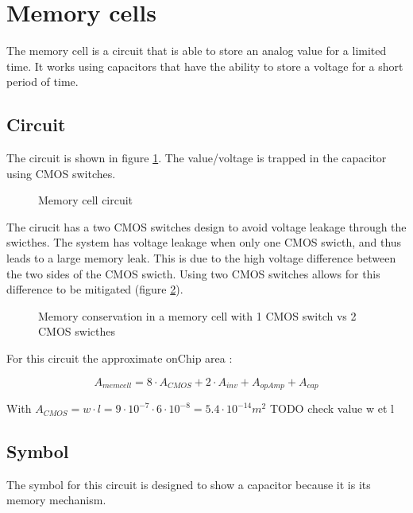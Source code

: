 \section{Memory cells}
\label{sec:memcell}

The memory cell is a circuit that is able to store an analog value for a limited time. It works using capacitors that have the ability to store a voltage for a short period of time.

\subsection{Circuit}

The circuit is shown in figure \ref{fig:memcellCircuit}. The value/voltage is trapped in the capacitor using \ac{CMOS} switches.

\begin{figure}[H]
  \centering
  
  \caption{Memory cell circuit}
  \label{fig:memcellCircuit}
\end{figure}

The cirucit has a two \ac{CMOS} switches design to avoid voltage leakage through the swicthes. The system has voltage leakage when only one \ac{CMOS} swicth, and thus leads to a large memory leak. This is due to the high voltage difference between the two sides of the \ac{CMOS} swicth. Using two \ac{CMOS} switches allows for this difference to be mitigated (figure \ref{fig:memcellLoss}).

\begin{figure}[H]
  \centering
  
  \caption{Memory conservation in a memory cell with 1 \ac{CMOS} switch vs 2 \ac{CMOS} swicthes}
  \label{fig:memcellLoss}
\end{figure}

For this circuit the approximate onChip area :

\begin{equation}
  A_{memcell}=8\cdot A_{CMOS}+2\cdot A_{inv}+A_{opAmp}+A_{cap}
\end{equation}

With $A_{CMOS} = w\cdot l = 9\cdot 10^{-7} \cdot 6 \cdot 10^{-8} = 5.4 \cdot 10^{-14} m^2$ TODO check value w et l

\subsection{Symbol}

The symbol for this circuit is designed to show a capacitor because it is its memory mechanism.

